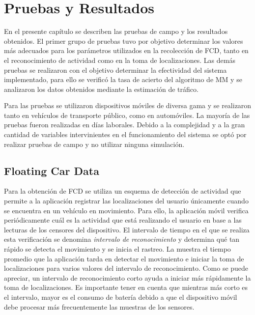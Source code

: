 \chapter{Pruebas y Resultados}

En el presente capítulo se describen las pruebas de campo y los resultados obtenidos. El primer grupo de pruebas tuvo por objetivo determinar los valores más adecuados para los parámetros utilizados en la recolección de FCD, tanto en el reconocimiento de actividad como en la toma de localizaciones. Las demás pruebas se realizaron con el objetivo determinar la efectividad del sistema implementado, para ello se verificó la tasa de acierto del algoritmo de MM y se analizaron los datos obtenidos mediante la estimación de tráfico.

Para las pruebas se utilizaron dispositivos móviles de diversa gama y se realizaron tanto en vehículos de transporte público, como en automóviles. La mayoría de las pruebas fueron realizadas en días laborales. Debido a la complejidad y a la gran cantidad de variables intervinientes en el funcionamiento del sistema se optó por realizar pruebas de campo y no utilizar ninguna simulación.

\section{Floating Car Data}

Para la obtención de FCD se utiliza un esquema de detección de actividad que permite a la aplicación registrar las localizaciones del usuario únicamente cuando se encuentra en un vehículo en movimiento. Para ello, la aplicación móvil verifica periódicamente cuál es la actividad que está realizando el usuario en base a las lecturas de los censores del dispositivo. El intervalo de tiempo en el que se realiza esta verificación se denomina \emph{intervalo de reconocimiento} y determina qué tan rápido se detecta el movimiento y se inicia el rastreo. La  muestra el tiempo promedio que la aplicación tarda en detectar el movimiento e iniciar la toma de localizaciones para varios valores del intervalo de reconocimiento. Como se puede apreciar, un intervalo de reconocimiento corto ayuda a iniciar más rápidamente la toma de localizaciones. Es importante tener en cuenta que mientras más corto es el intervalo, mayor es el consumo de batería debido a que el dispositivo móvil debe procesar más frecuentemente las muestras de los sensores.

